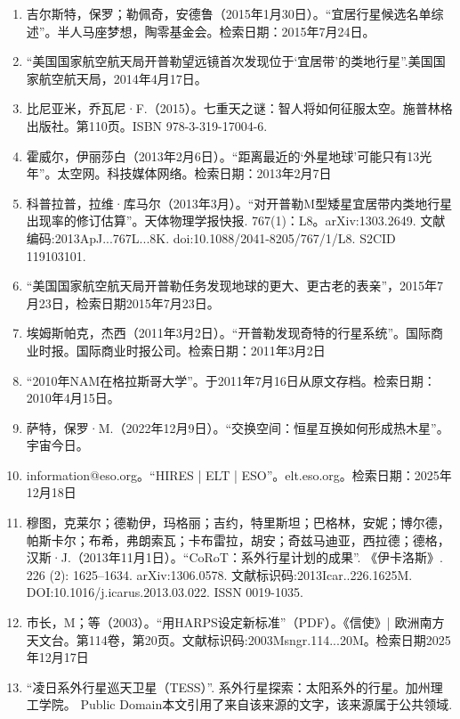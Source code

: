 \begin{enumerate}
\item 吉尔斯特，保罗；勒佩奇，安德鲁（2015年1月30日）。“宜居行星候选名单综述”。半人马座梦想，陶零基金会。检索日期：2015年7月24日。
\item “美国国家航空航天局开普勒望远镜首次发现位于‘宜居带’的类地行星”.美国国家航空航天局，2014年4月17日。
\item 比尼亚米，乔瓦尼·F.（2015）。七重天之谜：智人将如何征服太空。施普林格出版社。第110页。ISBN 978-3-319-17004-6.
\item 霍威尔，伊丽莎白（2013年2月6日）。“距离最近的‘外星地球’可能只有13光年”。太空网。科技媒体网络。检索日期：2013年2月7日
\item 科普拉普，拉维·库马尔（2013年3月）。“对开普勒M型矮星宜居带内类地行星出现率的修订估算”。天体物理学报快报. 767(1)：L8。arXiv:1303.2649. 文献编码:2013ApJ...767L...8K. doi:10.1088/2041-8205/767/1/L8. S2CID 119103101.
\item “美国国家航空航天局开普勒任务发现地球的更大、更古老的表亲”，2015年7月23日，检索日期2015年7月23日。
\item 埃姆斯帕克，杰西（2011年3月2日）。“开普勒发现奇特的行星系统”。国际商业时报。国际商业时报公司。检索日期：2011年3月2日
\item “2010年NAM在格拉斯哥大学”。于2011年7月16日从原文存档。检索日期：2010年4月15日。
\item 萨特，保罗·M.（2022年12月9日）。“交换空间：恒星互换如何形成热木星”。宇宙今日。
\item information@eso.org。“HIRES | ELT | ESO”。elt.eso.org。检索日期：2025年12月18日
\item 穆图，克莱尔；德勒伊，玛格丽；吉约，特里斯坦；巴格林，安妮；博尔德，帕斯卡尔；布希，弗朗索瓦；卡布雷拉，胡安；奇兹马迪亚，西拉德；德格，汉斯·J.（2013年11月1日）。“CoRoT：系外行星计划的成果”. 《伊卡洛斯》. 226 (2): 1625–1634. arXiv:1306.0578. 文献标识码:2013Icar..226.1625M. DOI:10.1016/j.icarus.2013.03.022. ISSN 0019-1035.
\item 市长，M；等（2003）。“用HARPS设定新标准”（PDF）。《信使》| 欧洲南方天文台。第114卷，第20页。文献标识码:2003Msngr.114...20M。检索日期2025年12月17日
\item “凌日系外行星巡天卫星（TESS）”. 系外行星探索：太阳系外的行星。加州理工学院。 Public Domain本文引用了来自该来源的文字，该来源属于公共领域.
\end{enumerate}
